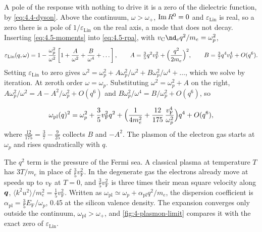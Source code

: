 A pole of the response with nothing to drive it is a zero of the dielectric function, by \cref{eq:4.4-dyson}. Above the continuum, $\omega > \omega_+$, $\operatorname{Im} R^0 = 0$ and $\varepsilon_{\mathrm{Lin}}$ is real, so a zero there is a pole of $1/\varepsilon_{\mathrm{Lin}}$ on the real axis, a mode that does not decay. Inserting \cref{eq:4.5-moments} into \cref{eq:4.5-rpa}, with $v_{\mathrm{C}}\nd_eq^2/m_e = \omega_p^2$,
\begin{equation*}
  \varepsilon_{\mathrm{Lin}}(q,\omega) = 1 - \frac{\omega_p^2}{\omega^2}\left[1 + \frac{A}{\omega^2} + \frac{B}{\omega^4} + \dots\right], \qquad
  A = \tfrac35q^2v_{\mathrm{F}}^2 + \Bigl(\frac{q^2}{2m_e}\Bigr)^2, \qquad B = \tfrac37q^4v_{\mathrm{F}}^4 + O(q^6) .
\end{equation*}
Setting $\varepsilon_{\mathrm{Lin}}$ to zero gives $\omega^2 = \omega_p^2 + A\omega_p^2/\omega^2 + B\omega_p^2/\omega^4 + \dots$, which we solve by iteration. At zeroth order $\omega = \omega_p$. Substituting $\omega^2 = \omega_p^2 + A$ on the right, $A\omega_p^2/\omega^2 = A - A^2/\omega_p^2 + O(q^6)$ and $B\omega_p^2/\omega^4 = B/\omega_p^2 + O(q^6)$, so
\begin{keyresult}
\begin{equation}
  \omega_{\mathrm{pl}}(q)^2 = \omega_p^2 + \frac35v_{\mathrm{F}}^2q^2 + \Bigl(\frac{1}{4m_e^2} + \frac{12}{175}\,\frac{v_{\mathrm{F}}^4}{\omega_p^2}\Bigr)q^4 + O(q^6) ,
  \label{eq:4.5-dispersion}
\end{equation}
where $\tfrac{12}{175} = \tfrac37 - \tfrac{9}{25}$ collects $B$ and $-A^2$. The plasmon of the electron gas starts at $\omega_p$ and rises quadratically with $q$.
\end{keyresult}
The $q^2$ term is the pressure of the Fermi sea. A classical plasma at temperature $T$ has $3T/m_e$ in place of $\tfrac35v_{\mathrm{F}}^2$. In the degenerate gas the electrons already move at speeds up to $v_{\mathrm{F}}$ at $T = 0$, and $\tfrac35v_{\mathrm{F}}^2$ is three times their mean square velocity along $\bm{q}$, $\langle k^2u^2\rangle/m_e^2 = \tfrac15v_{\mathrm{F}}^2$. Written as $\omega_{\mathrm{pl}} \simeq \omega_p + \alpha_{\mathrm{pl}}q^2/m_e$, the dispersion coefficient is $\alpha_{\mathrm{pl}} = \tfrac35E_{\mathrm{F}}/\omega_p$, 0.45 at the silicon valence density. The expansion converges only outside the continuum, $\omega_{\mathrm{pl}} > \omega_+$, and \cref{fig:4-plasmon-limit} compares it with the exact zero of $\varepsilon_{\mathrm{Lin}}$.

